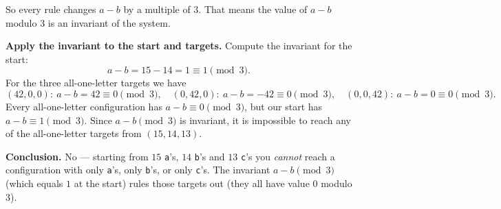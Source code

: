\documentclass[12pt]{article}
\begin{document}
So every rule changes \(a-b\) by a multiple of \(3\). That means the value of \(a-b\) modulo \(3\) is an invariant of the system.

\bigskip

\textbf{Apply the invariant to the start and targets.}  
Compute the invariant for the start:
\[
a-b = 15-14 = 1 \equiv 1 \pmod{3}.
\]
For the three all-one-letter targets we have
\[
(42,0,0):\ a-b=42\equiv 0\pmod{3},\quad
(0,42,0):\ a-b=-42\equiv 0\pmod{3},\quad
(0,0,42):\ a-b=0\equiv 0\pmod{3}.
\]
Every all-one-letter configuration has \(a-b\equiv 0\pmod{3}\), but our start has \(a-b\equiv 1\pmod{3}\). Since \(a-b\pmod{3}\) is invariant, it is impossible to reach any of the all-one-letter targets from \((15,14,13)\).

\bigskip

\textbf{Conclusion.}  
No — starting from \(15\) \texttt{a}'s, \(14\) \texttt{b}'s and \(13\) \texttt{c}'s you \emph{cannot} reach a configuration with only \texttt{a}'s, only \texttt{b}'s, or only \texttt{c}'s. The invariant \(a-b\pmod{3}\) (which equals \(1\) at the start) rules those targets out (they all have value \(0\) modulo \(3\)).
\end{document}
